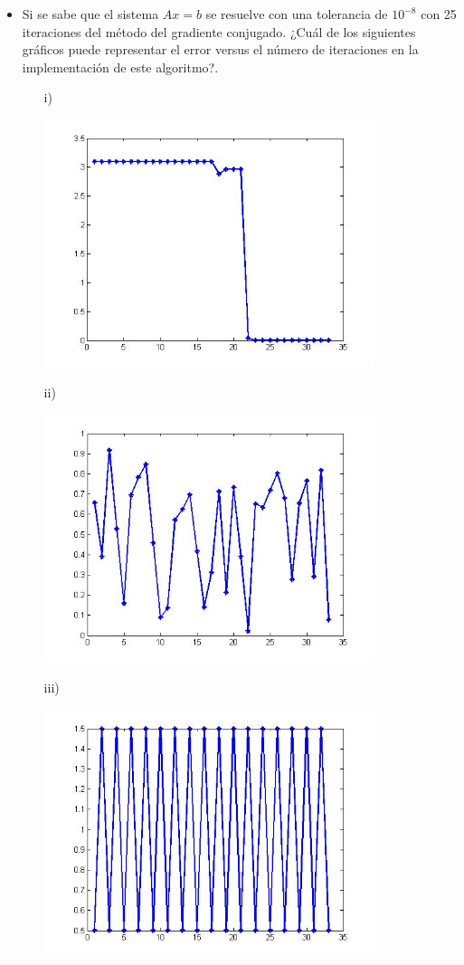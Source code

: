 \documentclass[11pt]{article}
\begin{document}
\begin{itemize}
\item Si se sabe que el sistema $Ax=b$ se resuelve con una tolerancia de $10^{-8}$ con 25 iteraciones del método del gradiente conjugado. ¿Cu\'al de los siguientes gr\'aficos puede representar el error versus el número de iteraciones en la implementación de este algoritmo?. 
\begin{enumerate}
\item[i)]
\begin{centering}
\includegraphics[width=0.8\textwidth]{p1.jpg}
\end{centering}
\item[ii)] 
\begin{centering}
\includegraphics[width=0.8\textwidth]{p2.jpg}
\end{centering}
\item[iii)]
\begin{centering}
\includegraphics[width=0.8\textwidth]{p3.jpg}

\end{centering}
\end{enumerate}
\end{itemize}
\end{document}
